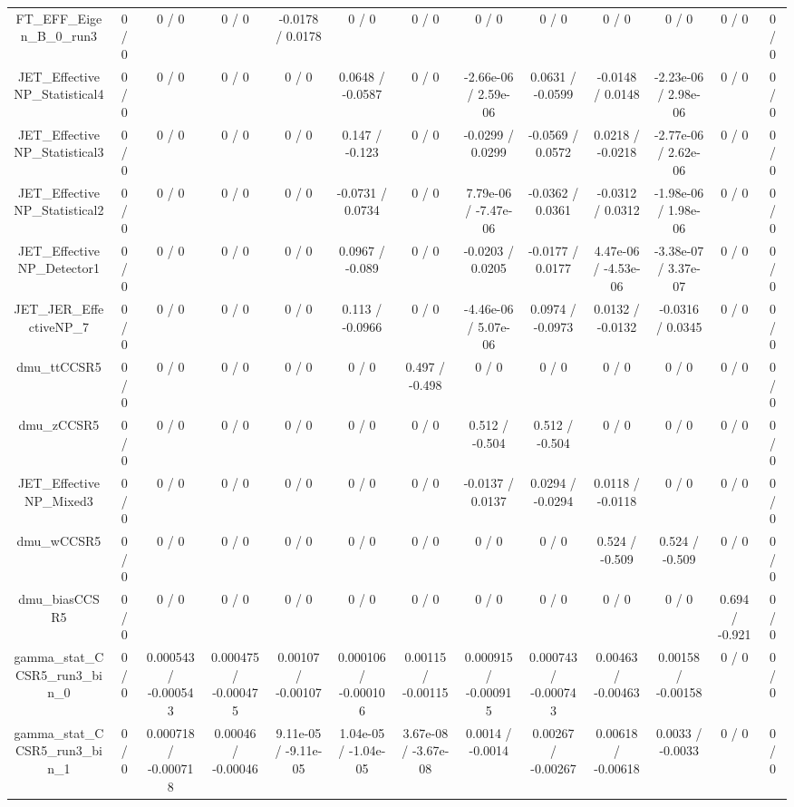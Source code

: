 \documentclass[10pt]{article}
\begin{document}
\begin{table}[htbp]
\begin{center}
\begin{tabular}{|c|c|c|c|c|c|c|c|c|c|c|c|c|}
  FT_EFF_Eigen_B_0_run3 & 0 / 0 & 0 / 0 & 0 / 0 & -0.0178 / 0.0178 & 0 / 0 & 0 / 0 & 0 / 0 & 0 / 0 & 0 / 0 & 0 / 0 & 0 / 0 & 0 / 0 \\ 
  JET_EffectiveNP_Statistical4 & 0 / 0 & 0 / 0 & 0 / 0 & 0 / 0 & 0.0648 / -0.0587 & 0 / 0 & -2.66e-06 / 2.59e-06 & 0.0631 / -0.0599 & -0.0148 / 0.0148 & -2.23e-06 / 2.98e-06 & 0 / 0 & 0 / 0 \\ 
  JET_EffectiveNP_Statistical3 & 0 / 0 & 0 / 0 & 0 / 0 & 0 / 0 & 0.147 / -0.123 & 0 / 0 & -0.0299 / 0.0299 & -0.0569 / 0.0572 & 0.0218 / -0.0218 & -2.77e-06 / 2.62e-06 & 0 / 0 & 0 / 0 \\ 
  JET_EffectiveNP_Statistical2 & 0 / 0 & 0 / 0 & 0 / 0 & 0 / 0 & -0.0731 / 0.0734 & 0 / 0 & 7.79e-06 / -7.47e-06 & -0.0362 / 0.0361 & -0.0312 / 0.0312 & -1.98e-06 / 1.98e-06 & 0 / 0 & 0 / 0 \\ 
  JET_EffectiveNP_Detector1 & 0 / 0 & 0 / 0 & 0 / 0 & 0 / 0 & 0.0967 / -0.089 & 0 / 0 & -0.0203 / 0.0205 & -0.0177 / 0.0177 & 4.47e-06 / -4.53e-06 & -3.38e-07 / 3.37e-07 & 0 / 0 & 0 / 0 \\ 
  JET_JER_EffectiveNP_7 & 0 / 0 & 0 / 0 & 0 / 0 & 0 / 0 & 0.113 / -0.0966 & 0 / 0 & -4.46e-06 / 5.07e-06 & 0.0974 / -0.0973 & 0.0132 / -0.0132 & -0.0316 / 0.0345 & 0 / 0 & 0 / 0 \\ 
  dmu_ttCCSR5 & 0 / 0 & 0 / 0 & 0 / 0 & 0 / 0 & 0 / 0 & 0.497 / -0.498 & 0 / 0 & 0 / 0 & 0 / 0 & 0 / 0 & 0 / 0 & 0 / 0 \\ 
  dmu_zCCSR5 & 0 / 0 & 0 / 0 & 0 / 0 & 0 / 0 & 0 / 0 & 0 / 0 & 0.512 / -0.504 & 0.512 / -0.504 & 0 / 0 & 0 / 0 & 0 / 0 & 0 / 0 \\ 
  JET_EffectiveNP_Mixed3 & 0 / 0 & 0 / 0 & 0 / 0 & 0 / 0 & 0 / 0 & 0 / 0 & -0.0137 / 0.0137 & 0.0294 / -0.0294 & 0.0118 / -0.0118 & 0 / 0 & 0 / 0 & 0 / 0 \\ 
  dmu_wCCSR5 & 0 / 0 & 0 / 0 & 0 / 0 & 0 / 0 & 0 / 0 & 0 / 0 & 0 / 0 & 0 / 0 & 0.524 / -0.509 & 0.524 / -0.509 & 0 / 0 & 0 / 0 \\ 
  dmu_biasCCSR5 & 0 / 0 & 0 / 0 & 0 / 0 & 0 / 0 & 0 / 0 & 0 / 0 & 0 / 0 & 0 / 0 & 0 / 0 & 0 / 0 & 0.694 / -0.921 & 0 / 0 \\ 
  gamma_stat_CCSR5_run3_bin_0 & 0 / 0 & 0.000543 / -0.000543 & 0.000475 / -0.000475 & 0.00107 / -0.00107 & 0.000106 / -0.000106 & 0.00115 / -0.00115 & 0.000915 / -0.000915 & 0.000743 / -0.000743 & 0.00463 / -0.00463 & 0.00158 / -0.00158 & 0 / 0 & 0 / 0 \\ 
  gamma_stat_CCSR5_run3_bin_1 & 0 / 0 & 0.000718 / -0.000718 & 0.00046 / -0.00046 & 9.11e-05 / -9.11e-05 & 1.04e-05 / -1.04e-05 & 3.67e-08 / -3.67e-08 & 0.0014 / -0.0014 & 0.00267 / -0.00267 & 0.00618 / -0.00618 & 0.0033 / -0.0033 & 0 / 0 & 0 / 0 \\ 

\end{tabular}
\end{center}
\end{table}
\end{document}
